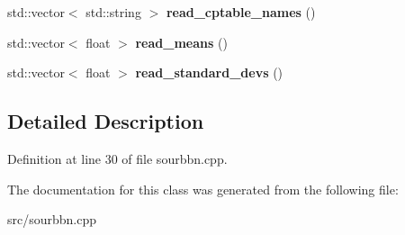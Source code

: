 \begin{DoxyCompactItemize}
std\+::vector$<$ std\+::string $>$ {\bfseries read\+\_\+cptable\+\_\+names} ()
\item 
\mbox{\label{classsourbbn_1_1Sourbbn_1_1sourbbn__impl_aaef1488589da89e8ec4f22c5aa3d3549}} 
std\+::vector$<$ float $>$ {\bfseries read\+\_\+means} ()
\item 
\mbox{\label{classsourbbn_1_1Sourbbn_1_1sourbbn__impl_a530095808922213e22d259d9e1ed0b6c}} 
std\+::vector$<$ float $>$ {\bfseries read\+\_\+standard\+\_\+devs} ()
\end{DoxyCompactItemize}


\subsection{Detailed Description}


Definition at line 30 of file sourbbn.\+cpp.



The documentation for this class was generated from the following file\+:\begin{DoxyCompactItemize}
\item 
src/sourbbn.\+cpp\end{DoxyCompactItemize}
